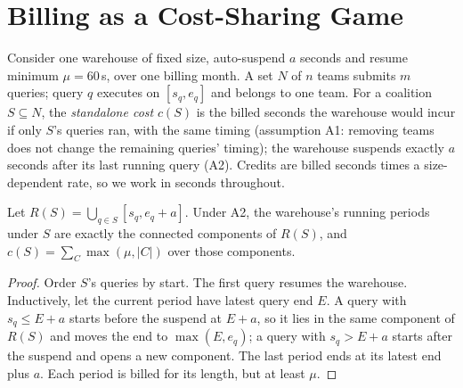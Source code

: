 \documentclass[sigconf]{acmart}
\begin{document}
\section{Billing as a Cost-Sharing Game}\label{sec:model}
Consider one warehouse of fixed size, auto-suspend $a$ seconds and resume minimum $\mu = 60$\,s, over one billing month.
A set $N$ of $n$ teams submits $m$ queries; query $q$ executes on $[s_q, e_q]$ and belongs to one team. For a coalition
$S \subseteq N$, the \emph{standalone cost} $c(S)$ is the billed seconds the warehouse would incur if only $S$'s queries ran,
with the same timing (assumption A1: removing teams does not change the remaining queries' timing); the warehouse suspends
exactly $a$ seconds after its last running query (A2). Credits are billed seconds times a size-dependent rate, so we work in
seconds throughout.

\begin{lemma}\label{lem:periods}
Let $R(S) = \bigcup_{q \in S} [s_q, e_q + a]$. Under A2, the warehouse's running periods under $S$ are exactly the connected
components of $R(S)$, and $c(S) = \sum_{C} \max(\mu, |C|)$ over those components.
\end{lemma}
\begin{proof}
Order $S$'s queries by start. The first query resumes the warehouse. Inductively, let the current period have latest
query end $E$. A query with $s_q \le E + a$ starts before the suspend at $E + a$, so it lies in the same component of $R(S)$
and moves the end to $\max(E, e_q)$; a query with $s_q > E + a$ starts after the suspend and opens a new component. The last
period ends at its latest end plus $a$. Each period is billed for its length, but at least $\mu$.
\end{proof}
\end{document}
